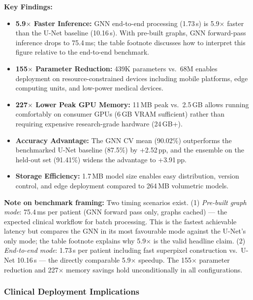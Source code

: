 \documentclass{article}
\begin{document}
\textbf{Key Findings:}
\begin{itemize}
    \item \textbf{5.9$\times$ Faster Inference:} GNN end-to-end processing (1.73\,s) is 5.9$\times$ faster than the U-Net baseline (10.16\,s). With pre-built graphs, GNN forward-pass inference drops to 75.4\,ms; the table footnote discusses how to interpret this figure relative to the end-to-end benchmark.

    \item \textbf{155$\times$ Parameter Reduction:} 439K parameters vs.\ 68M enables deployment on resource-constrained devices including mobile platforms, edge computing units, and low-power medical devices.

    \item \textbf{227$\times$ Lower Peak GPU Memory:} 11\,MB peak vs.\ 2.5\,GB allows running comfortably on consumer GPUs (6\,GB VRAM sufficient) rather than requiring expensive research-grade hardware (24\,GB+).

    \item \textbf{Accuracy Advantage:} The GNN CV mean (90.02\%) outperforms the benchmarked U-Net baseline (87.5\%) by +2.52\,pp, and the ensemble on the held-out set (91.41\%) widens the advantage to +3.91\,pp.

    \item \textbf{Storage Efficiency:} 1.7\,MB model size enables easy distribution, version control, and edge deployment compared to 264\,MB volumetric models.
\end{itemize}

\textbf{Note on benchmark framing:} Two timing scenarios exist. (1) \textit{Pre-built graph mode}: 75.4\,ms per patient (GNN forward pass only, graphs cached) — the expected clinical workflow for batch processing. This is the fastest achievable latency but compares the GNN in its most favourable mode against the U-Net's only mode; the table footnote explains why 5.9$\times$ is the valid headline claim. (2) \textit{End-to-end mode}: 1.73\,s per patient including fast superpixel construction vs.\ U-Net 10.16\,s — the directly comparable 5.9$\times$ speedup. The 155$\times$ parameter reduction and 227$\times$ memory savings hold unconditionally in all configurations.

\subsubsection{Clinical Deployment Implications}
\end{document}
